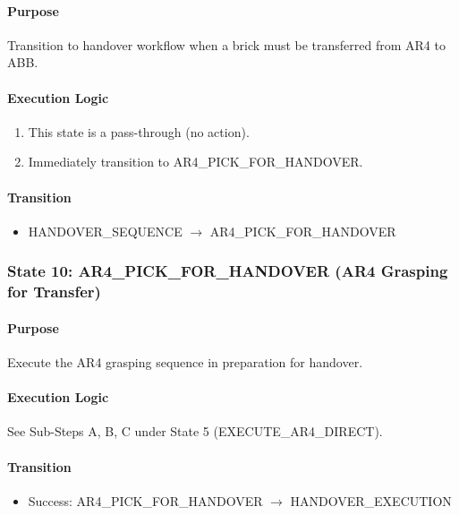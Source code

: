 \paragraph{Purpose}

Transition to handover workflow when a brick must be transferred from AR4 to ABB.

\paragraph{Execution Logic}

\begin{enumerate}
    \item This state is a pass-through (no action).
    \item Immediately transition to AR4\_PICK\_FOR\_HANDOVER.
\end{enumerate}

\paragraph{Transition}

\begin{itemize}
    \item HANDOVER\_SEQUENCE $\rightarrow$ AR4\_PICK\_FOR\_HANDOVER
\end{itemize}

\subsubsection{State 10: AR4\_PICK\_FOR\_HANDOVER (AR4 Grasping for Transfer)}
\label{state:ar4pickhandover}

\paragraph{Purpose}

Execute the AR4 grasping sequence in preparation for handover.

\paragraph{Execution Logic}

See Sub-Steps A, B, C under State 5 (EXECUTE\_AR4\_DIRECT).

\paragraph{Transition}

\begin{itemize}
    \item Success: AR4\_PICK\_FOR\_HANDOVER $\rightarrow$ HANDOVER\_EXECUTION
\end{itemize}

